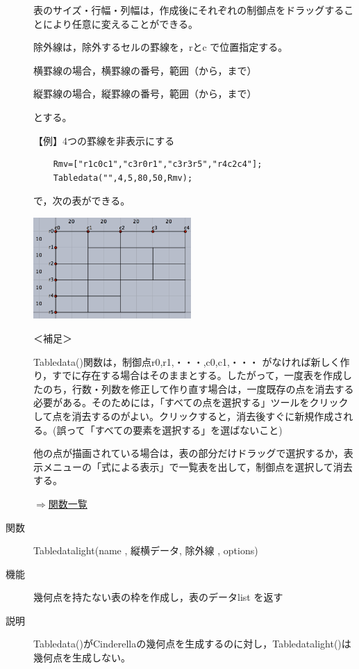 \documentclass[papersize,a4paper,12pt,uplatex]{jsarticle}
\begin{document}
\begin{description}
  表のサイズ・行幅・列幅は，作成後にそれぞれの制御点をドラッグすることにより任意に変えることができる。

\vspace{\baselineskip}
除外線は，除外するセルの罫線を，rとc で位置指定する。
  
\hspace{10mm} 横罫線の場合，横罫線の番号，範囲（から，まで）

\hspace{10mm} 縦罫線の場合，縦罫線の番号，範囲（から，まで）

とする。

\vspace{\baselineskip}
【例】4つの罫線を非表示にする
\begin{verbatim}
    Rmv=["r1c0c1","c3r0r1","c3r3r5","r4c2c4"];
    Tabledata("",4,5,80,50,Rmv);
\end{verbatim}
      
で，次の表ができる。
  
\vspace{\baselineskip}
\hspace{20mm}  \includegraphics[bb=0 0 392.02 251.51 , width=6cm]{Fig/table03.pdf}

\vspace{\baselineskip}
＜補足＞

Tabledata()関数は，制御点r0,r1,・・・,c0,c1,・・・  がなければ新しく作り，すでに存在する場合はそのままとする。したがって，一度表を作成したのち，行数・列数を修正して作り直す場合は，一度既存の点を消去する必要がある。そのためには，「すべての点を選択する」ツールをクリックして点を消去するのがよい。クリックすると，消去後すぐに新規作成される。(誤って「すべての要素を選択する」を選ばないこと)
  
他の点が描画されている場合は，表の部分だけドラッグで選択するか，表示メニューの「式による表示」で一覧表を出して，制御点を選択して消去する。

\begin{flushright}  \hyperlink{functionlist}{$\Rightarrow$関数一覧}\end{flushright}

\vspace{\baselineskip}
\hypertarget{tabledatalight}{}
\item[関数]  Tabledatalight(name , 縦横データ, 除外線 , options)
\item[機能]  幾何点を持たない表の枠を作成し，表のデータlist を返す
\item[説明]  Tabledata()がCinderellaの幾何点を生成するのに対し，Tabledatalight()は幾何点を生成しない。


\end{description}
\end{document}

